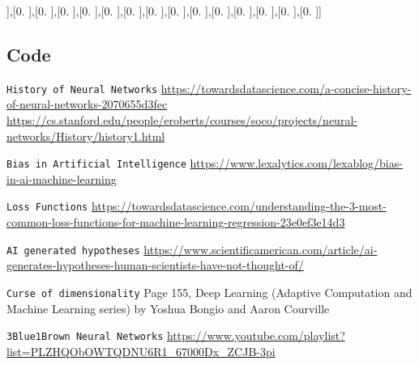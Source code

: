 \documentclass[titlepage]{article}
\begin{document}
     ],[0.        ],[0.        ],[0.        ],[0.        ],[0.        ],[0.        ],[0.        ],[0.        ],[0.        ],[0.        ],[0.        ],[0.        ],[0.        ],[0.        ]]

\subsection{Code}


\begin{thebibliography}{9}
    \texttt{History of Neural Networks}
    \url{https://towardsdatascience.com/a-concise-history-of-neural-networks-2070655d3fec}
    \url{https://cs.stanford.edu/people/eroberts/courses/soco/projects/neural-networks/History/history1.html}
   
    \texttt{Bias in Artificial Intelligence}
    \url{https://www.lexalytics.com/lexablog/bias-in-ai-machine-learning}

    \texttt{Loss Functions}
    \url{https://towardsdatascience.com/understanding-the-3-most-common-loss-functions-for-machine-learning-regression-23e0ef3e14d3}

    \texttt{AI generated hypotheses}
    \url{https://www.scientificamerican.com/article/ai-generates-hypotheses-human-scientists-have-not-thought-of/}

    \texttt{Curse of dimensionality}
    Page 155, Deep Learning (Adaptive Computation and Machine Learning series) by Yoshua Bongio and Aaron Courville

    \texttt{3Blue1Brown Neural Networks}
    \url{https://www.youtube.com/playlist?list=PLZHQObOWTQDNU6R1_67000Dx_ZCJB-3pi}
\end{thebibliography}
\end{document}
